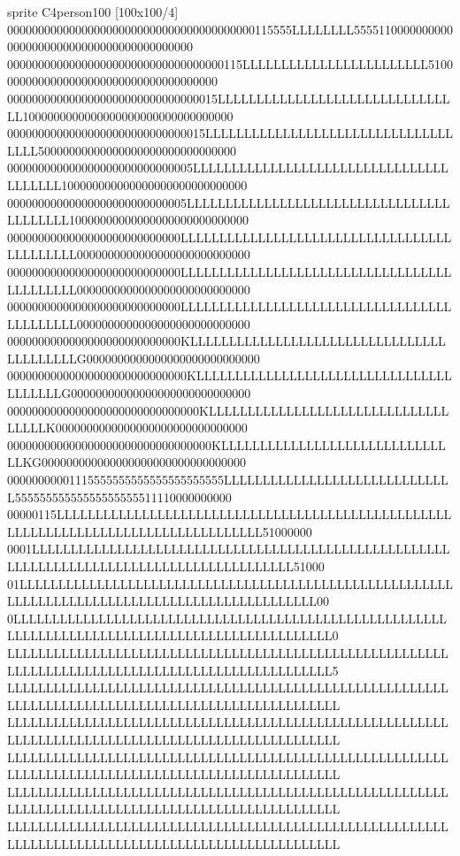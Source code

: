 \documentclass[letterpaper,10pt,english]{sphinxmanual}
\begin{document}
\begin{sphinxVerbatim}[commandchars=\\\{\},numbers=left,firstnumber=1,stepnumber=1]
sprite \PYGZdl{}C4person100 [100x100/4] \PYGZob{}
0000000000000000000000000000000000000000115555LLLLLLLL5555110000000000000000000000000000000000000000
00000000000000000000000000000000000115LLLLLLLLLLLLLLLLLLLLLLLL51000000000000000000000000000000000000
0000000000000000000000000000000015LLLLLLLLLLLLLLLLLLLLLLLLLLLLLLLL1000000000000000000000000000000000
00000000000000000000000000000015LLLLLLLLLLLLLLLLLLLLLLLLLLLLLLLLLLLL50000000000000000000000000000000
000000000000000000000000000005LLLLLLLLLLLLLLLLLLLLLLLLLLLLLLLLLLLLLLLL100000000000000000000000000000
00000000000000000000000000005LLLLLLLLLLLLLLLLLLLLLLLLLLLLLLLLLLLLLLLLLL10000000000000000000000000000
0000000000000000000000000000LLLLLLLLLLLLLLLLLLLLLLLLLLLLLLLLLLLLLLLLLLLL0000000000000000000000000000
0000000000000000000000000000LLLLLLLLLLLLLLLLLLLLLLLLLLLLLLLLLLLLLLLLLLLL0000000000000000000000000000
0000000000000000000000000000LLLLLLLLLLLLLLLLLLLLLLLLLLLLLLLLLLLLLLLLLLLL0000000000000000000000000000
0000000000000000000000000000KLLLLLLLLLLLLLLLLLLLLLLLLLLLLLLLLLLLLLLLLLLG0000000000000000000000000000
00000000000000000000000000000KLLLLLLLLLLLLLLLLLLLLLLLLLLLLLLLLLLLLLLLLG00000000000000000000000000000
0000000000000000000000000000000KLLLLLLLLLLLLLLLLLLLLLLLLLLLLLLLLLLLLK0000000000000000000000000000000
000000000000000000000000000000000KLLLLLLLLLLLLLLLLLLLLLLLLLLLLLLLKG000000000000000000000000000000000
00000000001115555555555555555555555LLLLLLLLLLLLLLLLLLLLLLLLLLLLLL55555555555555555555511110000000000
00000115LLLLLLLLLLLLLLLLLLLLLLLLLLLLLLLLLLLLLLLLLLLLLLLLLLLLLLLLLLLLLLLLLLLLLLLLLLLLLLLLLLLL51000000
0001LLLLLLLLLLLLLLLLLLLLLLLLLLLLLLLLLLLLLLLLLLLLLLLLLLLLLLLLLLLLLLLLLLLLLLLLLLLLLLLLLLLLLLLLLLL51000
01LLLLLLLLLLLLLLLLLLLLLLLLLLLLLLLLLLLLLLLLLLLLLLLLLLLLLLLLLLLLLLLLLLLLLLLLLLLLLLLLLLLLLLLLLLLLLLLL00
0LLLLLLLLLLLLLLLLLLLLLLLLLLLLLLLLLLLLLLLLLLLLLLLLLLLLLLLLLLLLLLLLLLLLLLLLLLLLLLLLLLLLLLLLLLLLLLLLLL0
LLLLLLLLLLLLLLLLLLLLLLLLLLLLLLLLLLLLLLLLLLLLLLLLLLLLLLLLLLLLLLLLLLLLLLLLLLLLLLLLLLLLLLLLLLLLLLLLLLL5
LLLLLLLLLLLLLLLLLLLLLLLLLLLLLLLLLLLLLLLLLLLLLLLLLLLLLLLLLLLLLLLLLLLLLLLLLLLLLLLLLLLLLLLLLLLLLLLLLLLL
LLLLLLLLLLLLLLLLLLLLLLLLLLLLLLLLLLLLLLLLLLLLLLLLLLLLLLLLLLLLLLLLLLLLLLLLLLLLLLLLLLLLLLLLLLLLLLLLLLLL
LLLLLLLLLLLLLLLLLLLLLLLLLLLLLLLLLLLLLLLLLLLLLLLLLLLLLLLLLLLLLLLLLLLLLLLLLLLLLLLLLLLLLLLLLLLLLLLLLLLL
LLLLLLLLLLLLLLLLLLLLLLLLLLLLLLLLLLLLLLLLLLLLLLLLLLLLLLLLLLLLLLLLLLLLLLLLLLLLLLLLLLLLLLLLLLLLLLLLLLLL
LLLLLLLLLLLLLLLLLLLLLLLLLLLLLLLLLLLLLLLLLLLLLLLLLLLLLLLLLLLLLLLLLLLLLLLLLLLLLLLLLLLLLLLLLLLLLLLLLLLL

\end{sphinxVerbatim}
\end{document}
